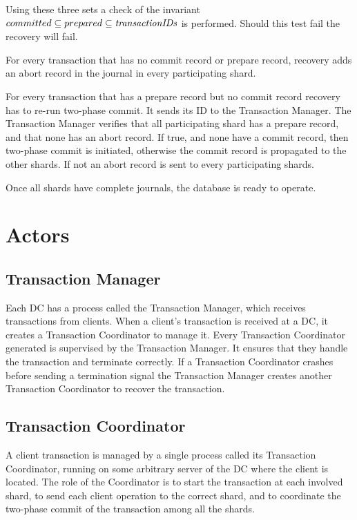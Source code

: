 \documentclass[twoside]{article}
\begin{document}
Using these three sets a check of the invariant $ committed 
\subseteq prepared \subseteq \emph{transactionIDs} $ is performed.
Should this test fail the recovery will fail.
 
For every transaction that has no commit record or prepare record, recovery adds an 
abort record in the journal in every participating shard. 

For every transaction that has a prepare record but no commit record recovery has 
to re-run two-phase commit.
It sends its ID to the Transaction Manager. 
The Transaction Manager verifies that all participating shard has a
prepare record, and that none has an abort record.
If true, and none have a commit record, then two-phase commit is 
initiated, otherwise the commit record is propagated to the other shards. 
If not an abort record is sent to every participating shards.

Once all shards have complete journals, the database is ready to operate.



\section{Actors}
\subsection{Transaction Manager}
\label{sec:transaction-daemon}

Each DC has a process called the Transaction Manager, which 
receives transactions from clients.
When a client's transaction is received at a DC, it creates a Transaction
Coordinator to manage it.
Every Transaction Coordinator generated is supervised by the Transaction Manager. 
It ensures that they handle the transaction and terminate correctly.
If a Transaction Coordinator crashes before sending a termination 
signal the Transaction Manager creates another Transaction 
Coordinator to recover the transaction.


\subsection{Transaction Coordinator}
\label{sec:transaction-coordinator}
            
A client transaction is managed by a single process called its
Transaction Coordinator, running on some arbitrary server of the DC
where the client is located.
The role of the Coordinator is to start the transaction at each involved
shard, to send each client operation to the correct shard, and to
coordinate the two-phase commit of the transaction among all the shards.
\end{document}
